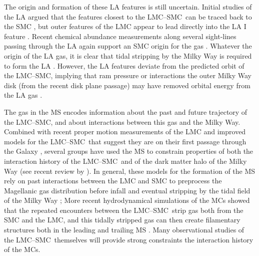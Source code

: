 \documentclass[twocolumn]{aastex62}
\newcommand{\lmcsmc}{LMC--SMC}
\begin{document}
The origin and formation of these LA features is still uncertain.
Initial studies of the LA argued that the features closest to the \lmcsmc\ can be traced back to the SMC \citep{Putman:1998}, but outer features of the LMC appear to lead directly into the LA I feature \citep{Nidever:2008}.
Recent chemical abundance measurements along several sight-lines passing through the LA again support an SMC origin for the gas \citep{Fox:2018, Richter:2018}.
Whatever the origin of the LA gas, it is clear that tidal stripping by the Milky Way is required to form the LA \citep{Nidever:2008, Besla:2012}.
However, the LA features deviate from the predicted orbit of the \lmcsmc, implying that ram pressure or interactions the outer Milky Way disk (from the recent disk plane passage) may have removed orbital energy from the LA gas \citep[e.g.,][]{Bekki:2008}.

The gas in the MS encodes information about the past and future trajectory of the \lmcsmc, and about interactions between this gas and the Milky Way.
Combined with recent proper motion measurements of the LMC \citep{Kallivayalil:2006, Kallivayalil:2013} and improved models for the \lmcsmc\ that suggest they are on their first passage through the Galaxy \citep{Besla:2007, Besla:2010, Besla:2012}, several groups have used the MS to constrain properties of both the interaction history of the \lmcsmc\ and of the dark matter halo of the Milky Way (see recent review by \citealt{DOnghia:2016}).
In general, these models for the formation of the MS rely on past interactions between the LMC and SMC to preprocess the Magellanic gas distribution before infall and eventual stripping by the tidal field of the Milky Way \citep{Besla:2012, Diaz:2012};
More recent hydrodynamical simulations of the MCs showed that the repeated encounters between the \lmcsmc\ strip gas both from the SMC and the LMC, and this tidally stripped gas can then create filamentary structures both in the leading and trailing MS \citep{Pardy:2018}.
Many observational studies \citep[e.g.,][]{Olsen:2011, Noel:2013, Mackey:2016, Carrera:2017, Choi:2018a, Choi:2018b, Zivick:2018, Belokurov:2019} of the \lmcsmc\ themselves will provide strong constraints the interaction history of the MCs.
\end{document}
